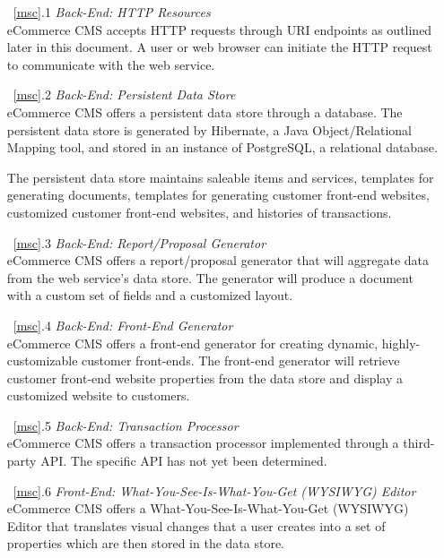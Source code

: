 \documentclass{article}
\newcommand{\br}{\vspace{2mm}}
\begin{document}
\begin{enumerate}
    \item[~\ref{msc}.1 ] \emph{Back-End: HTTP Resources}\br\\
        eCommerce CMS accepts HTTP requests through URI endpoints as outlined
        later in this document.  A user or web browser can initiate the HTTP
        request to communicate with the web service.
    \item[~\ref{msc}.2 ] \emph{Back-End: Persistent Data Store}\br\\
        eCommerce CMS offers a persistent data store through a database.  The
        persistent data store is generated by Hibernate, a Java Object/Relational
        Mapping tool, and stored in an instance of PostgreSQL, a relational
        database.

        The persistent data store maintains saleable items and services, templates
        for generating documents, templates for generating customer front-end
        websites, customized customer front-end websites, and histories of
        transactions.
    \item[~\ref{msc}.3 ] \emph{Back-End: Report/Proposal Generator}\br\\
        eCommerce CMS offers a report/proposal generator that will aggregate
        data from the web service's data store.  The generator will produce a
        document with a custom set of fields and a customized layout.
    \item[~\ref{msc}.4 ] \emph{Back-End: Front-End Generator}\br\\
        eCommerce CMS offers a front-end generator for creating dynamic, highly-
        customizable customer front-ends.  The front-end generator will retrieve
        customer front-end website properties from the data store and display
        a customized website to customers.
    \item[~\ref{msc}.5 ] \emph{Back-End: Transaction Processor}\br\\
        eCommerce CMS offers a transaction processor implemented through a
        third-party API.  The specific API has not yet been determined.
    \item[~\ref{msc}.6 ] \emph{Front-End: What-You-See-Is-What-You-Get (WYSIWYG) Editor}\br\\
        eCommerce CMS offers a What-You-See-Is-What-You-Get (WYSIWYG) Editor that
        translates visual changes that a user creates into a set of properties
        which are then stored in the data store.

\end{enumerate}
\end{document}
